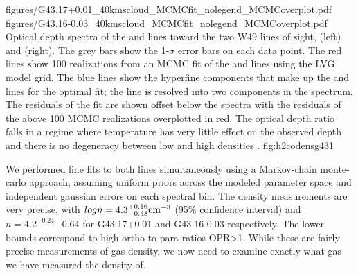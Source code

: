 \FigureTwo
          {figures/G43.17+0.01_40kmscloud_MCMCfit_nolegend_MCMCoverplot.pdf}
          {figures/G43.16-0.03_40kmscloud_MCMCfit_nolegend_MCMCoverplot.pdf}
{Optical depth spectra of the \oneone and \twotwo lines toward the two W49
lines of sight, \north (left) and \south (right).   The grey bars show the
1-$\sigma$ error bars on each data point.  The red lines show 100 realizations
from an MCMC fit of the \ortho \oneone and \twotwo lines using the LVG model
grid.  The blue lines show the hyperfine components that make up the \oneone
and \twotwo lines for the optimal fit; the \oneone line is resolved into two
components in the \north spectrum.  The residuals of the fit are shown offset
below the spectra with the residuals of the above 100 MCMC realizations
overplotted in red.  The optical depth ratio falls in a regime where
temperature has very little effect on the observed depth and there is no
degeneracy between low and high densities \citep{Ginsburg2011a}.  }
{fig:h2codensg43}{1}

We performed line fits to both lines simultaneously using a Markov-chain
monte-carlo approach, assuming uniform priors across the modeled parameter
space and independent gaussian errors on each spectral bin.  The density
measurements are very precise, with $log n = 4.3^{+0.16}_{-0.48} \textrm{cm}^{-3}$
(95\% confidence interval) and $n=4.2^{+0.24}{-0.64}$ \percc for
G43.17+0.01 and G43.16-0.03 respectively.  The lower bounds correspond to high ortho-to-para
ratios OPR>1.  While these are fairly precise measurements of gas density, we
now need to examine exactly what gas we have measured the density of.

